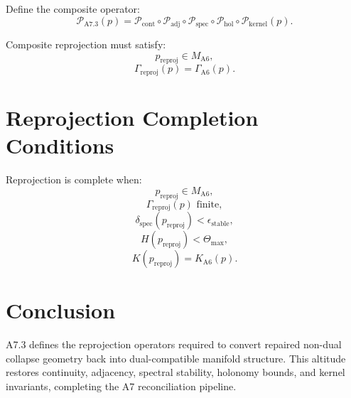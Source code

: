 \documentclass[11pt]{article}
\begin{document}
Define the composite operator:
\[
\mathcal{P}_{\mathrm{A7.3}}(p)
  = \mathcal{P}_{\mathrm{cont}}
    \circ \mathcal{P}_{\mathrm{adj}}
    \circ \mathcal{P}_{\mathrm{spec}}
    \circ \mathcal{P}_{\mathrm{hol}}
    \circ \mathcal{P}_{\mathrm{kernel}}(p).
\]

Composite reprojection must satisfy:
\[
p_{\mathrm{reproj}} \in M_{\mathrm{A6}},
\]
\[
\Gamma_{\mathrm{reproj}}(p) = \Gamma_{\mathrm{A6}}(p).
\]

\section{Reprojection Completion Conditions}

Reprojection is complete when:
\[
p_{\mathrm{reproj}} \in M_{\mathrm{A6}},
\]
\[
\Gamma_{\mathrm{reproj}}(p) \text{ finite},
\]
\[
\delta_{\mathrm{spec}}(p_{\mathrm{reproj}}) < \epsilon_{\mathrm{stable}},
\]
\[
H(p_{\mathrm{reproj}}) < \Theta_{\max},
\]
\[
K(p_{\mathrm{reproj}}) = K_{\mathrm{A6}}(p).
\]

\section{Conclusion}

A7.3 defines the reprojection operators required to convert repaired
non-dual collapse geometry back into dual-compatible manifold structure.
This altitude restores continuity, adjacency, spectral stability, holonomy
bounds, and kernel invariants, completing the A7 reconciliation pipeline.
\end{document}
